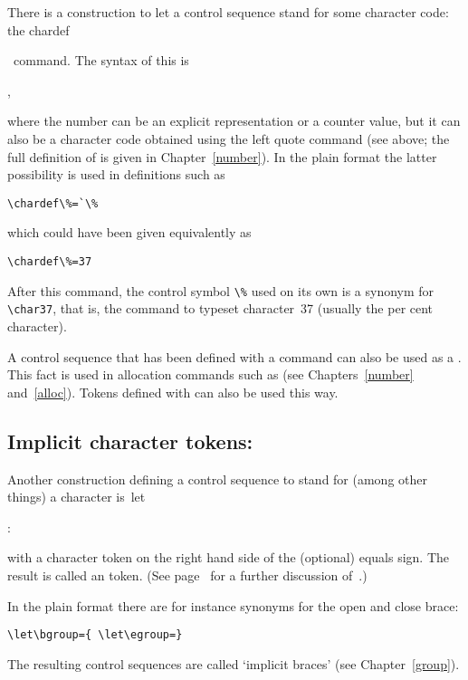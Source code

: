 There is a construction to let a control sequence stand
for some character code: the \csterm chardef\par\ command.
The syntax of this is \label{chardef}
\begin{disp}, 
\end{disp}
where the number can be an explicit
representation or a counter value, but it can also be
a character code
obtained using the left quote command (see above; 
the full definition of  is given in Chapter~\ref{number}). 
In the plain format 
the latter possibility is used in
definitions such as
\begin{verbatim}
\chardef\%=`\%
\end{verbatim}
which could have been given equivalently as
\begin{verbatim}
\chardef\%=37
\end{verbatim}
After this command, the control symbol \verb>\%>
used on its own is a synonym for \verb>\char37>,
that is, the command to typeset character~37
(usually the per cent character).

A control sequence that has been defined with a 
command can also be used as a .
This fact is used in  allocation commands such as 
 (see Chapters~\ref{number} and~\ref{alloc}).
Tokens defined with  can also be used this
way.

\subsection{Implicit character tokens: \protect{}}

Another construction defining a control sequence
to stand for (among other things)
a character is~\cstoidx let\par:
\begin{disp}\end{disp}
with a character token on the right hand side of the (optional)
equals sign. The result is called an  token.
(See page~\pageref{let} for a further discussion of~.)

In the
plain format there are for instance synonyms for
the open and close brace:
\begin{verbatim}
\let\bgroup={ \let\egroup=}
\end{verbatim}
The resulting control sequences are called `implicit braces'
(see Chapter~\ref{group}).

